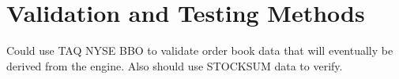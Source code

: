 \section{Validation and Testing Methods}

Could use TAQ NYSE BBO to validate order book data that will eventually be derived from the engine. Also should use STOCKSUM data to verify.

